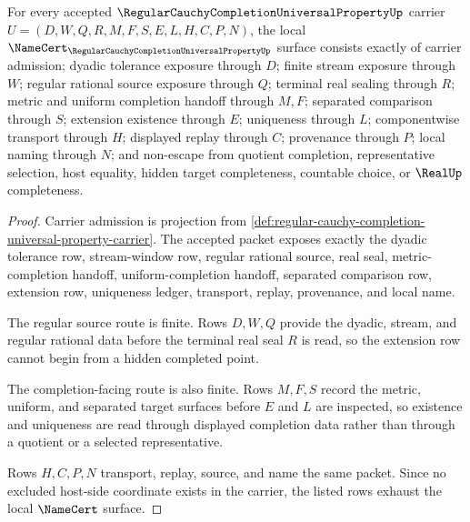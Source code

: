 \begin{theorem}
\label{thm:regular-cauchy-completion-universal-property-namecert-obligations}
For every accepted $\RegularCauchyCompletionUniversalPropertyUp$ carrier $U=(D,W,Q,R,M,F,S,E,L,H,C,P,N)$, the local $\NameCert_{\RegularCauchyCompletionUniversalPropertyUp}$ surface consists exactly of carrier admission; dyadic tolerance exposure through $D$; finite stream exposure through $W$; regular rational source exposure through $Q$; terminal real sealing through $R$; metric and uniform completion handoff through $M,F$; separated comparison through $S$; extension existence through $E$; uniqueness through $L$; componentwise transport through $H$; displayed replay through $C$; provenance through $P$; local naming through $N$; and non-escape from quotient completion, representative selection, host equality, hidden target completeness, countable choice, or $\RealUp$ completeness.
\end{theorem}
\begin{proof}
Carrier admission is projection from \autoref{def:regular-cauchy-completion-universal-property-carrier}. The accepted packet exposes exactly the dyadic tolerance row, stream-window row, regular rational source, real seal, metric-completion handoff, uniform-completion handoff, separated comparison row, extension row, uniqueness ledger, transport, replay, provenance, and local name.

The regular source route is finite. Rows $D,W,Q$ provide the dyadic, stream, and regular rational data before the terminal real seal $R$ is read, so the extension row cannot begin from a hidden completed point.

The completion-facing route is also finite. Rows $M,F,S$ record the metric, uniform, and separated target surfaces before $E$ and $L$ are inspected, so existence and uniqueness are read through displayed completion data rather than through a quotient or a selected representative.

Rows $H,C,P,N$ transport, replay, source, and name the same packet. Since no excluded host-side coordinate exists in the carrier, the listed rows exhaust the local $\NameCert$ surface.
\end{proof}


